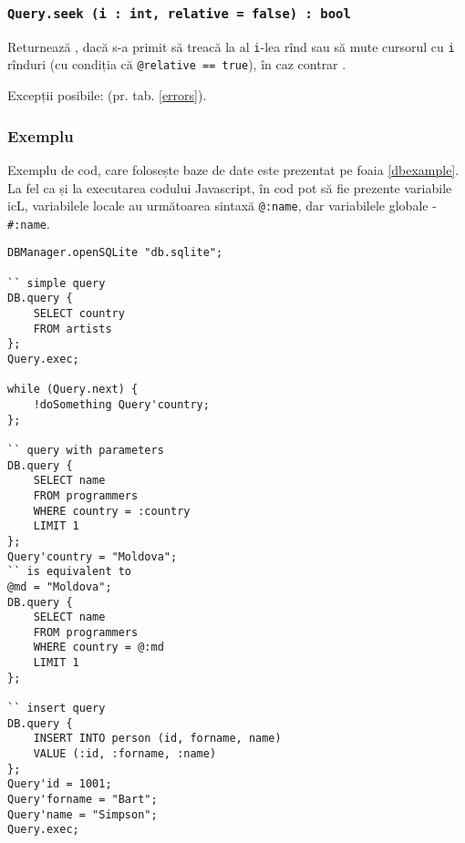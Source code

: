 \subsubsection{\texttt{Query.seek (i : int, relative = false) : bool}}

Returnează \true, dacă s-a primit să treacă la al \texttt{i}-lea rînd sau să mute cursorul cu \texttt{i} rînduri (cu condiția că \texttt{@relative == true}), în caz contrar \false.

Excepții posibile:  (pr. tab. \ref{errors}).

\subsubsection{Exemplu}

Exemplu de cod, care folosește baze de date este prezentat pe foaia \ref{dbexample}. La fel ca și la executarea codului Javascript, în cod pot să fie prezente variabile icL, variabilele locale au următoarea sintaxă \texttt{@:name}, dar variabilele globale - \texttt{\#:name}.

\newpage
\begin{sourcecode}
\label{dbexample}
\begin{verbatim}
DBManager.openSQLite "db.sqlite";

`` simple query
DB.query {
	SELECT country
	FROM artists
};
Query.exec;

while (Query.next) {
	!doSomething Query'country;
};

`` query with parameters
DB.query {
	SELECT name
	FROM programmers
	WHERE country = :country
	LIMIT 1
};
Query'country = "Moldova";
`` is equivalent to
@md = "Moldova";
DB.query {
	SELECT name
	FROM programmers
	WHERE country = @:md
	LIMIT 1
};

`` insert query
DB.query {
	INSERT INTO person (id, forname, name)
	VALUE (:id, :forname, :name)
};
Query'id = 1001;
Query'forname = "Bart";
Query'name = "Simpson";
Query.exec;
\end{verbatim}
\end{sourcecode}

